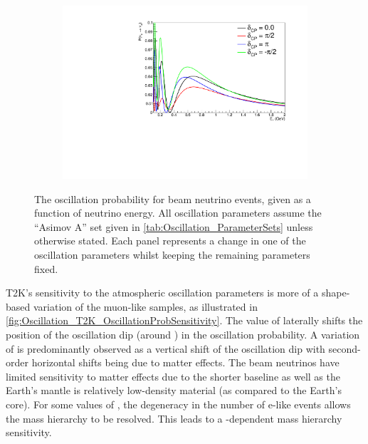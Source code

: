 \begin{figure}[h]
\begin{subfigure}[t]{0.5\textwidth}
    \includegraphics[width=\textwidth, trim={0mm 0mm 0mm 0mm}, clip,page=1]{Figures/Oscillation/T2K_NuMu_x_NuE_DCPSens.pdf}
    \subcaption{\dcp}
  \end{subfigure}
  \caption{The oscillation probability for beam neutrino events, given as a function of neutrino energy. All oscillation parameters assume the ``Asimov A'' set given in \autoref{tab:Oscillation_ParameterSets} unless otherwise stated. Each panel represents a change in one of the oscillation parameters whilst keeping the remaining parameters fixed.}
  \label{fig:Oscillation_T2K_OscillationProbSensitivity}
\end{figure}

T2K's sensitivity to the atmospheric oscillation parameters is more of a shape-based variation of the muon-like samples, as illustrated in \autoref{fig:Oscillation_T2K_OscillationProbSensitivity}. The value of  laterally shifts the position of the oscillation dip (around ) in the  oscillation probability. A variation of \sinsqatm is predominantly observed as a vertical shift of the oscillation dip with second-order horizontal shifts being due to matter effects. The beam neutrinos have limited sensitivity to matter effects due to the shorter baseline as well as the Earth's mantle is relatively low-density material (as compared to the Earth's core). For some values of \dcp, the degeneracy in the number of e-like events allows the mass hierarchy to be resolved. This leads to a \dcp-dependent mass hierarchy sensitivity. 

